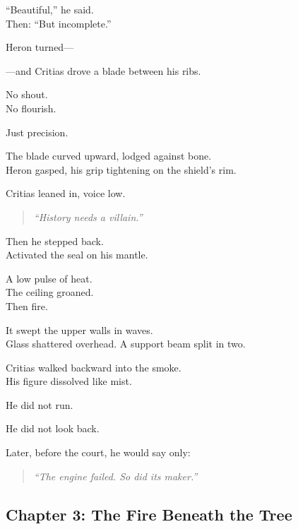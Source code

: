 \documentclass[12pt]{article}
\begin{document}
“Beautiful,” he said.\\
Then: “But incomplete.”

Heron turned—

—and Critias drove a blade between his ribs.

\vspace{1em}

No shout.\\
No flourish.

Just precision.

The blade curved upward, lodged against bone.\\
Heron gasped, his grip tightening on the shield’s rim.

Critias leaned in, voice low.

\begin{quote}
\textit{“History needs a villain.”}
\end{quote}

Then he stepped back.\\
Activated the seal on his mantle.

\vspace{1em}

A low pulse of heat.\\
The ceiling groaned.\\
Then fire.

It swept the upper walls in waves.\\
Glass shattered overhead.  
A support beam split in two.

\vspace{1em}

Critias walked backward into the smoke.\\
His figure dissolved like mist.

He did not run.

He did not look back.

\vspace{1em}

Later, before the court, he would say only:

\begin{quote}
\textit{“The engine failed. So did its maker.”}
\end{quote}

\newpage

\subsection{Chapter 3: The Fire Beneath the Tree}

\vspace{.5in}
\end{document}
